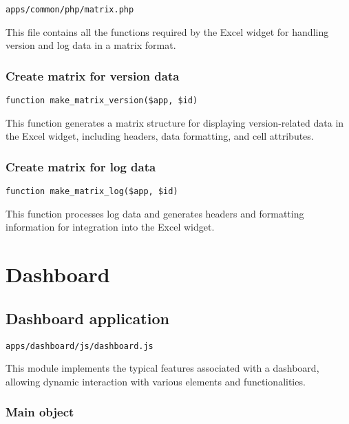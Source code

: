 \documentclass[a4paper]{article}
\begin{document}
\begin{lstlisting}
apps/common/php/matrix.php
\end{lstlisting}

This file contains all the functions required by the Excel widget for handling
version and log data in a matrix format.

\hypertarget{toc35}{}
\subsubsection{Create matrix for version data}

\begin{lstlisting}
function make_matrix_version($app, $id)
\end{lstlisting}

This function generates a matrix structure for displaying version-related data
in the Excel widget, including headers, data formatting, and cell attributes.

\hypertarget{toc36}{}
\subsubsection{Create matrix for log data}

\begin{lstlisting}
function make_matrix_log($app, $id)
\end{lstlisting}

This function processes log data and generates headers and formatting information
for integration into the Excel widget.


\hypertarget{toc37}{}
\section{Dashboard}

\hypertarget{toc38}{}
\subsection{Dashboard application}

\begin{lstlisting}
apps/dashboard/js/dashboard.js
\end{lstlisting}

This module implements the typical features associated with a dashboard,
allowing dynamic interaction with various elements and functionalities.

\hypertarget{toc39}{}
\subsubsection{Main object}
\end{document}
